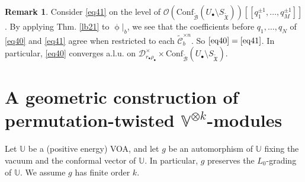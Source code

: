 \documentclass[12pt,a4paper,notitlepage]{article}
\theoremstyle{definition}
\newtheorem{rem}[df]{Remark}
\theoremstyle{plain}
\newcommand{\fk}{\mathfrak}
\newcommand{\mc}{\mathcal}
\newcommand{\wtd}{\widetilde}
\newcommand{\Conf}{\mathrm{Conf}}
\newcommand{\scr}{\mathscr}
\newcommand{\blt}{\bullet}
\newcommand{\Vbb}{\mathbb V}
\newcommand{\Ubb}{\mathbb U}
\newcommand{\SXtd}{S_{\wtd{\fk X}}}
\numberwithin{equation}{section}
\begin{document}
\begin{rem}
Consider \eqref{eq41} on the level of $\scr O(\Conf_{\wtd{\mc B}}(U_\blt\setminus\SXtd))[[q_1^{\pm 1},\dots,q_M^{\pm 1}]]$. By applying Thm. \ref{lb21} to $\upphi|_b$, we see that the coefficients before $q_1,\dots,q_N$ of \eqref{eq40} and \eqref{eq41} agree when restricted to each $\wtd{\mc C}_b^{\times n}$. So $\eqref{eq40}=\eqref{eq41}$. In particular, \eqref{eq40} converges a.l.u. on $\mc D_{r_\blt\rho_\blt}^\times\times\Conf_{\wtd{\mc B}}(U_\blt\setminus\SXtd)$.
\end{rem}





\section{A geometric construction of permutation-twisted $\Vbb^{\otimes k}$-modules}\label{lb24}



Let $\Ubb$ be a (positive energy) VOA, and let $g$ be an automorphism of $\Ubb$ fixing the vacuum and the conformal vector of $\Ubb$. In particular, $g$ preserves the $L_0$-grading of $\Ubb$. We assume $g$ has finite order $k$. 
\end{document}
